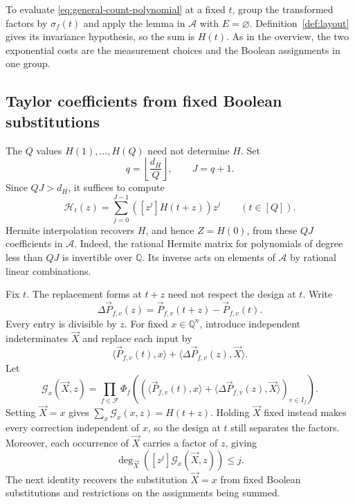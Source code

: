\documentclass[11pt,reqno]{amsart}
\numberwithin{equation}{section}
\theoremstyle{definition}\newtheorem{definition}[theorem]{Definition}
\theoremstyle{remark}\newtheorem{remark}[theorem]{Remark}
\renewcommand{\le}{\leqslant}
\begin{document}
To evaluate \eqref{eq:general-count-polynomial} at a fixed $t$, group
the transformed factors by $\sigma_f(t)$ and apply the lemma in
$\mathcal A$ with $E=\varnothing$. Definition~\ref{def:layout}
gives its invariance hypothesis, so the sum is $H(t)$. As in the overview, the two exponential costs
are the measurement choices and the Boolean assignments in one group.

\subsection{Taylor coefficients from fixed Boolean substitutions}
\label{subsec:fixed-boolean-substitutions}
The $Q$ values $H(1),\ldots,H(Q)$ need not determine $H$.
Set
\begin{equation}\label{eq:hasse-order}
 q=\left\lfloor\frac{d_H}{Q}\right\rfloor,\qquad J=q+1.
\end{equation}
Since $QJ>d_H$, it suffices to compute
\begin{equation}\label{eq:taylor-truncation}
 \mathcal H_t(z)=\sum_{j=0}^{J-1}([z^j]H(t+z))z^j
 \qquad(t\in[Q]).
\end{equation}
Hermite interpolation recovers $H$, and hence $Z=H(0)$, from these
$QJ$ coefficients in $\mathcal A$. Indeed, the rational Hermite
matrix for polynomials of degree less than $QJ$ is invertible over
$\mathbb Q$. Its inverse acts on elements of $\mathcal A$ by rational
linear combinations.

Fix $t$. The replacement forms at $t+z$ need not respect the design
at $t$. Write
\[
 \Delta\vec P_{f,v}(z)=\vec P_{f,v}(t+z)-\vec P_{f,v}(t).
\]
Every entry is divisible by $z$. For fixed $x\in\mathbb Q^n$,
introduce independent indeterminates $\vec X$ and replace each input by
\begin{equation}\label{eq:jet-substitution}
 \langle\vec P_{f,v}(t),x\rangle
       +\langle\Delta\vec P_{f,v}(z),\vec X\rangle.
\end{equation}
Let
\begin{equation}\label{eq:auxiliary-polynomial}
 \mathcal G_x(\vec X,z)=\prod_{f\in\mathcal F}
 \Phi_f\!\left(
  (\langle\vec P_{f,v}(t),x\rangle+
   \langle\Delta\vec P_{f,v}(z),\vec X\rangle)_{v\in I_f}\right).
\end{equation}
Setting $\vec X=x$ gives
$\sum_x\mathcal G_x(x,z)=H(t+z)$.
Holding $\vec X$ fixed instead makes every correction independent
of $x$, so the design at $t$ still separates the factors.
Moreover, each occurrence of $\vec X$ carries a factor of $z$, giving
\begin{equation}\label{eq:degree-cost}
 \deg_{\vec X}([z^j]\mathcal G_x(\vec X,z))\le j.
\end{equation}
The next identity recovers the substitution $\vec X=x$ from fixed
Boolean substitutions and restrictions on the assignments being summed.
\end{document}
